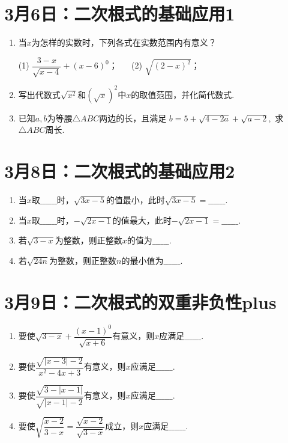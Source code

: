 \section*{3月6日：二次根式的基础应用1}


\begin{enumerate}
    \item 当$x$为怎样的实数时，下列各式在实数范围内有意义？
    
    (1) $\dfrac{3-x}{\sqrt{x-4}}+(x-6)^0$；
    ~~
    (2) $\sqrt{(2-x)^2}$；
    \item 写出代数式$\sqrt{x^2}$和$(\sqrt{x})^2$中$x$的取值范围，并化简代数式.
    \item 已知$a, b$为等腰$\triangle ABC$两边的长，且满足
    $b=5+\sqrt{4-2a}+\sqrt{a-2},$
    求$\triangle ABC$周长.
\end{enumerate}


\section*{3月8日：二次根式的基础应用2}

\begin{enumerate}
    \item 当$x$取$\_\_\_\_\_\_$时，$\sqrt{3x-5}$的值最小，此时$\sqrt{3x-5}=\_\_\_\_\_\_$.
    \item 当$x$取$\_\_\_\_\_\_$时，$-\sqrt{2x-1}$的值最大，此时$-\sqrt{2x-1}=\_\_\_\_\_\_$.
    \item 若$\sqrt{3-x}$为整数，则正整数$x$的值为$\_\_\_\_\_\_$.
    \item 若$\sqrt{24n}$为整数，则正整数$n$的最小值为$\_\_\_\_\_\_$.
\end{enumerate}


\section*{3月9日：二次根式的双重非负性plus}

\begin{enumerate}
\item 要使$\sqrt{3-x}+\dfrac{(x-1)^0}{\sqrt{x+6}}$有意义，则$x$应满足$\_\_\_\_\_\_$.
\item 要使$\dfrac{\sqrt{|x-3|-2}}{x^2-4x+3}$有意义，则$x$应满足$\_\_\_\_\_\_$.
\item 要使$\dfrac{\sqrt{3-|x-1|}}{\sqrt{|x-1|-2}}$有意义，则$x$应满足$\_\_\_\_\_\_$.
\item 要使$\sqrt{\dfrac{x-2}{3-x}}=\dfrac{\sqrt{x-2}}{\sqrt{3-x}}$成立，则$x$应满足$\_\_\_\_\_\_$.
\end{enumerate}




